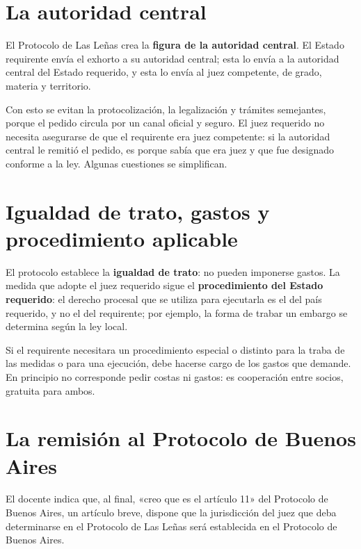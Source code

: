 \documentclass[12pt,oneside]{book}
\begin{document}

\section{La autoridad central}

El Protocolo de Las Leñas crea la \textbf{figura de la autoridad central}. El Estado requirente envía el exhorto a su autoridad central; esta lo envía a la autoridad central del Estado requerido, y esta lo envía al juez competente, de grado, materia y territorio.

Con esto se evitan la protocolización, la legalización y trámites semejantes, porque el pedido circula por un canal oficial y seguro. El juez requerido no necesita asegurarse de que el requirente era juez competente: si la autoridad central le remitió el pedido, es porque sabía que era juez y que fue designado conforme a la ley. Algunas cuestiones se simplifican.

\section{Igualdad de trato, gastos y procedimiento aplicable}

El protocolo establece la \textbf{igualdad de trato}: no pueden imponerse gastos. La medida que adopte el juez requerido sigue el \textbf{procedimiento del Estado requerido}: el derecho procesal que se utiliza para ejecutarla es el del país requerido, y no el del requirente; por ejemplo, la forma de trabar un embargo se determina según la ley local.

Si el requirente necesitara un procedimiento especial o distinto para la traba de las medidas o para una ejecución, debe hacerse cargo de los gastos que demande. En principio no corresponde pedir costas ni gastos: es cooperación entre socios, gratuita para ambos.

\section{La remisión al Protocolo de Buenos Aires}

El docente indica que, al final, «creo que es el artículo 11» del Protocolo de Buenos Aires, un artículo breve, dispone que la jurisdicción del juez que deba determinarse en el Protocolo de Las Leñas será establecida en el Protocolo de Buenos Aires.
\end{document}
